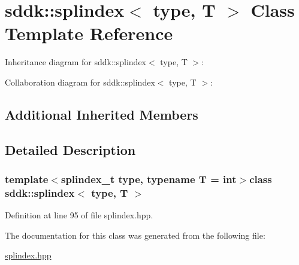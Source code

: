 \hypertarget{classsddk_1_1splindex}{}\section{sddk\+:\+:splindex$<$ type, T $>$ Class Template Reference}
\label{classsddk_1_1splindex}


Inheritance diagram for sddk\+:\+:splindex$<$ type, T $>$\+:


Collaboration diagram for sddk\+:\+:splindex$<$ type, T $>$\+:
\subsection*{Additional Inherited Members}


\subsection{Detailed Description}
\subsubsection*{template$<$splindex\+\_\+t type, typename T = int$>$class sddk\+::splindex$<$ type, T $>$}



Definition at line 95 of file splindex.\+hpp.



The documentation for this class was generated from the following file\+:\begin{DoxyCompactItemize}
\item 
\hyperlink{splindex_8hpp}{splindex.\+hpp}\end{DoxyCompactItemize}
